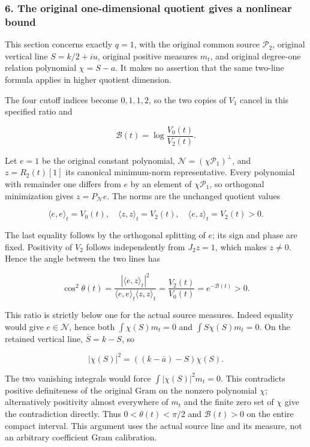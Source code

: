 \documentclass{article}
\begin{document}
\subsubsection{6. The original one-dimensional quotient gives a nonlinear bound}\label{endpoint-window_review--the-original-one-dimensional-quotient-gives-a-nonlinear-bound}

This section concerns exactly \(q=1\), with the original common source \(\mathcal P_2\), original vertical line \(S=k/2+iu\), original positive measures \(m_t\), and original degree-one relation polynomial \(\chi=S-a\). It makes no assertion that the same two-line formula applies in higher quotient dimension.

The four cutoff indices become \(0,1,1,2\), so the two copies of \(V_1\) cancel in this specified ratio and

\[
\mathcal B(t)=\log\frac{V_0(t)}{V_2(t)}.
\tag{WS30}
\]

Let \(e=1\) be the original constant polynomial, \(\mathcal N=(\chi\mathcal P_1)^\perp\), and \(z=R_2(t)[1]\) its canonical minimum-norm representative. Every polynomial with remainder one differs from \(e\) by an element of \(\chi\mathcal P_1\), so orthogonal minimization gives \(z=P_{\mathcal N}e\). The norms are the unchanged quotient values

\[
\langle e,e\rangle_t=V_0(t),\quad
\langle z,z\rangle_t=V_2(t),\quad
\langle e,z\rangle_t=V_2(t)>0.
\tag{WS31}
\]

The last equality follows by the orthogonal splitting of \(e\); its sign and phase are fixed. Positivity of \(V_2\) follows independently from \(J_2z=1\), which makes \(z\ne0\). Hence the angle between the two lines has

\[
\cos^2\theta(t)
=\frac{|\langle e,z\rangle_t|^2}
        {\langle e,e\rangle_t\langle z,z\rangle_t}
=\frac{V_2(t)}{V_0(t)}=e^{-\mathcal B(t)}>0.
\tag{WS32}
\]

This ratio is strictly below one for the actual source measures. Indeed equality would give \(e\in\mathcal N\), hence both \(\int\chi(S)m_t=0\) and \(\int S\chi(S)m_t=0\). On the retained vertical line, \(\bar S=k-S\), so

\[
|\chi(S)|^2=((k-\bar a)-S)\chi(S).
\tag{WS33}
\]

The two vanishing integrals would force \(\int|\chi(S)|^2m_t=0\). This contradicts positive definiteness of the original Gram on the nonzero polynomial \(\chi\); alternatively positivity almost everywhere of \(m_t\) and the finite zero set of \(\chi\) give the contradiction directly. Thus \(0<\theta(t)<\pi/2\) and \(\mathcal B(t)>0\) on the entire compact interval. This argument uses the actual source line and its measure, not an arbitrary coefficient Gram calibration.
\end{document}
